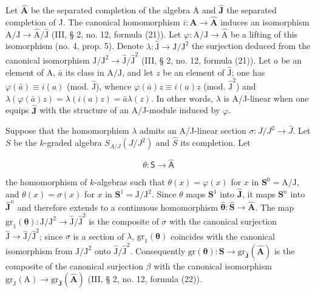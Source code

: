Let \(\widehat{\mathbf{A}}\) be the separated completion of the algebra A and \(\widehat{\mathbf{J}}\) the separated completion of J. The canonical homomorphism \(i: \mathbf{A} \to \widehat{\mathbf{A}}\) induces an isomorphism \(\mathrm{A} / \mathrm{J} \longrightarrow \widehat{\mathrm{A}} / \widehat{\mathrm{J}}\) (III, § 2, no. 12, formula (21)). Let \(\varphi: \mathrm{A} / \mathrm{J} \to \widehat{\mathrm{A}}\) be a lifting of this isomorphism (no. 4, prop. 5). Denote \(\lambda: \widehat{\mathrm{J}} \to \mathrm{J} / \mathrm{J}^2\) the surjection deduced from the canonical isomorphism \(\mathrm{J} / \mathrm{J}^2 \longrightarrow \widehat{\mathrm{J}} / \widehat{\mathrm{J}}^2\) (III, § 2, no. 12, formula (21)). Let \(a\) be an element of A, \(\bar{a}\) its class in \(\mathrm{A} / \mathrm{J}\), and let \(z\) be an element of \(\widehat{\mathrm{J}}\); one has \(\varphi(\bar{a}) \equiv i(a)\) (mod. \(\widehat{\mathrm{J}}\)), whence \(\varphi(\bar{a})z \equiv i(a)z\) (mod. \(\widehat{\mathrm{J}}^2\)) and \(\lambda(\varphi(\bar{a})z) = \lambda(i(a)z) = \bar{a}\lambda(z)\). In other words, \(\lambda\) is A/J-linear when one equips \(\widehat{\mathbf{J}}\) with the structure of an A/J-module induced by \(\varphi\).

Suppose that the homomorphism \(\lambda\) admits an A/J-linear section \(\sigma : J/J^{2} \longrightarrow \widehat{J}\). Let \(S\) be the \(k\)-graded algebra \(S_{A/J}(J/J^{2})\) and \(\widehat{S}\) its completion. Let

\[
\theta : \mathsf {S} \to \widehat {\mathsf {A}}
\]

the homomorphism of \(k\)-algebras such that \(\theta(x) = \varphi(x)\) for \(x\) in \(\mathbf{S}^0 = \mathrm{A}/\mathrm{J}\), and \(\theta(x) = \sigma(x)\) for \(x\) in \(\mathbf{S}^1 = \mathrm{J}/\mathrm{J}^2\). Since \(\theta\) maps \(\mathbf{S}^1\) into \(\widehat{\mathbf{J}}\), it maps \(\mathbf{S}^n\) into \(\widehat{\mathbf{J}}^n\) and therefore extends to a continuous homomorphism \(\widehat{\boldsymbol{\theta}}: \widehat{\mathbf{S}} \to \widehat{\mathbf{A}}\). The map \(\mathrm{gr}_1(\boldsymbol{\theta}): \mathrm{J}/\mathrm{J}^2 \longrightarrow \widehat{\mathrm{J}}/\widehat{\mathrm{J}}^2\) is the composite of \(\sigma\) with the canonical surjection \(\widehat{\mathrm{J}} \longrightarrow \widehat{\mathrm{J}}/\widehat{\mathrm{J}}^2\); since \(\sigma\) is a section of \(\lambda\), \(\mathrm{gr}_1(\boldsymbol{\theta})\) coincides with the canonical isomorphism from \(\mathrm{J}/\mathrm{J}^2\) onto \(\widehat{\mathrm{J}}/\widehat{\mathrm{J}}^2\). Consequently \(\mathrm{gr}(\boldsymbol{\theta}): \mathbf{S} \to \mathrm{gr}_{\widehat{\mathbf{J}}}(\widehat{\mathbf{A}})\) is the composite of the canonical surjection \(\beta\) with the canonical isomorphism \(\mathrm{gr}_\mathrm{J}(\mathrm{A}) \to \mathrm{gr}_{\widehat{\mathbf{J}}}(\widehat{\mathbf{A}})\) (III, § 2, no. 12, formula (22)).

